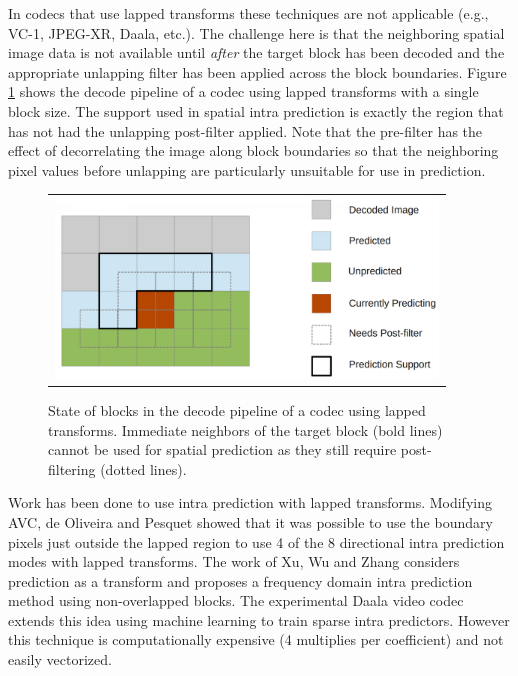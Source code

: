 \documentclass[a4paper]{spie}  %
\begin{document}
In codecs that use lapped transforms these techniques are not applicable (e.g.,
 VC-1, JPEG-XR, Daala, etc.).
The challenge here is that the neighboring spatial image data is not available
 until {\em after} the target block has been decoded and the appropriate
 unlapping filter has been applied across the block boundaries.
Figure \ref{fig:decode} shows the decode pipeline of a codec using lapped
 transforms with a single block size.
The support used in spatial intra prediction is exactly the region that has not
 had the unlapping post-filter applied.
Note that the pre-filter has the effect of decorrelating the image along block
 boundaries so that the neighboring pixel values before unlapping are
 particularly unsuitable for use in prediction.

\begin{figure}
\begin{center}
\begin{tabular}{c}
\includegraphics[natwidth=1376,natheight=646,width=4in]{daala_decode.png}
\end{tabular}
\end{center}
\caption[example]{\label{fig:decode} State of blocks in the decode pipeline of
 a codec using lapped transforms. Immediate neighbors of the target block
 (bold lines) cannot be used for spatial prediction as they still require
 post-filtering (dotted lines).}
\end{figure}


Work has been done to use intra prediction with lapped transforms.
Modifying AVC, de Oliveira and Pesquet showed that it was possible to use the
 boundary pixels just outside the lapped region to use 4 of the 8 directional
 intra prediction modes with lapped transforms\cite{oliv2011}.
The work of Xu, Wu and Zhang considers prediction as a transform and proposes
 a frequency domain intra prediction method using non-overlapped
 blocks\cite{xuwu2009}.
The experimental Daala video codec extends this idea using machine learning to
 train sparse intra predictors\cite{DaalaDemo2}.
However this technique is computationally expensive (4 multiplies per
 coefficient) and not easily vectorized.
\end{document}
